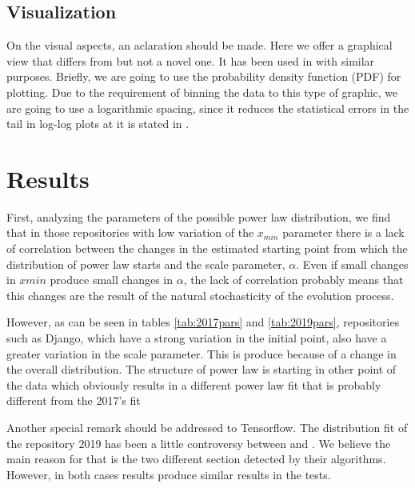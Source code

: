 \documentclass[conference]{IEEEtran}
\begin{document}
\subsection{Visualization}
 
On the visual aspects, an aclaration should be made. Here we offer a graphical view that differs from \cite{merelo2017self}
but not a novel one. It has been used in \cite{arafat2009commit} with similar purposes. 
Briefly, we are going to use the probability density function (PDF) for plotting. Due to the 
requirement of binning the data to this type of graphic, we are going to use a
logarithmic spacing, since it reduces the statistical errors in the tail in log-log 
plots at it is stated in \cite{newman2005power}.




\section{Results}
\label{res}
First, analyzing the parameters of the possible power law distribution, we find that in those repositories with low variation of the $x_{min}$ parameter there is a lack of correlation between the changes in the estimated starting point from which the distribution of power law starts and the scale parameter, $\alpha$. Even if small changes in $xmin$ produce small changes in $\alpha$, the lack of correlation probably means that this changes 
are the result of the natural stochasticity of the evolution process.  %

However, as can be seen in tables \ref{tab:2017pars} and \ref{tab:2019pars}, repositories such as Django, which have a strong variation in the initial point, also have a greater variation in the scale parameter. This is produce because of a change in the overall distribution. The structure of power law is starting in other point of the data which obviously results in a different power law fit that is probably different from the 2017's fit  %


Another special remark should be addressed to Tensorflow. The distribution fit of the repository 2019 has been a little controversy between \cite{alstott2014powerlaw} and \cite{gillespie2015power}. We believe the main reason for that is the two different section detected by their algorithms. However, in both cases results produce similar results in the tests.
\end{document}

